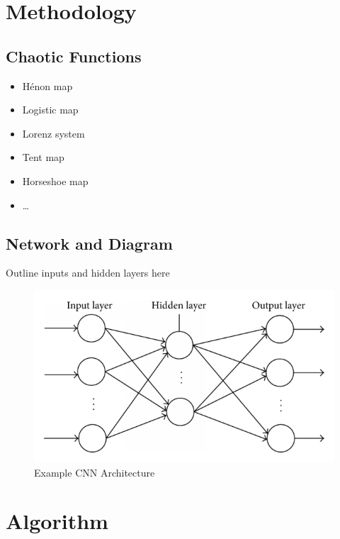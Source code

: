 \documentclass[conference]{IEEEtran}
\begin{document}
\section{Methodology}\label{sec:methodology}

\subsection{Chaotic Functions}\label{subsec:chaotic-functions}

\begin{itemize}
    \item Hénon map
    \item Logistic map
    \item Lorenz system
    \item Tent map
    \item Horseshoe map
    \item \ldots
\end{itemize}

\subsection{Network and Diagram}\label{subsec:network-and-diagram}

Outline inputs and hidden layers here

\begin{figure}[!ht]
    \centering
    \includegraphics{figures/CNN}
    \caption{Example CNN Architecture}
    \label{fig:CNN}
\end{figure}

\section{Algorithm}\label{sec:algorithm}
\end{document}
